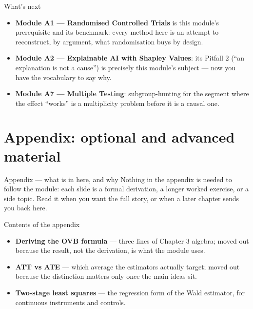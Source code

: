 \documentclass[aspectratio=169,11pt]{beamer}
\begin{document}
\begin{frame}{What's next}
  \begin{itemize}
    \item \textbf{Module A1 --- Randomised Controlled Trials} is this module's
          prerequisite and its benchmark: every method here is an attempt to
          reconstruct, by argument, what randomisation buys by design.
    \item \textbf{Module A2 --- Explainable AI with Shapley Values}: its Pitfall 2
          (``an explanation is not a cause'') is precisely this module's subject ---
          now you have the vocabulary to say why.
    \item \textbf{Module A7 --- Multiple Testing}: subgroup-hunting for the segment
          where the effect ``works'' is a multiplicity problem before it is a causal
          one.
  \end{itemize}
\end{frame}

\appendix
\AtBeginSection[]{}
\section{Appendix: optional and advanced material}

\begin{frame}{Appendix --- what is in here, and why}
  \footnotesize
  Nothing in the appendix is needed to follow the module: each slide is a formal
  derivation, a longer worked exercise, or a side topic. Read it when you want the
  full story, or when a later chapter sends you back here.
  \begin{block}{Contents of the appendix}
    \begin{itemize}
      \item \textbf{Deriving the OVB formula} --- three lines of Chapter 3 algebra;
            moved out because the result, not the derivation, is what the module
            uses.
      \item \textbf{ATT vs ATE} --- which average the estimators actually target;
            moved out because the distinction matters only once the main ideas sit.
      \item \textbf{Two-stage least squares} --- the regression form of the Wald
            estimator, for continuous instruments and controls.
    \end{itemize}
  \end{block}
\end{frame}
\end{document}
